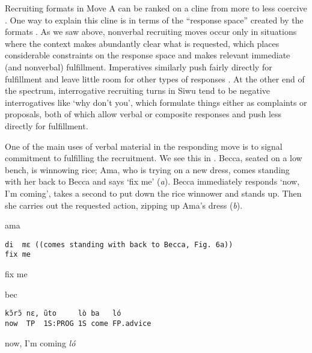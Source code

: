 \documentclass[output=paper]{langsci/langscibook}
\begin{document}
Recruiting formats in Move A can be ranked on a cline from more to less coercive \citep{brown_universals_1978}. One way to explain this cline is in terms of the “response space” created by the formats \citep[see][]{VinkhuyzenSzymanski2005,RossiZinken2016}. As we saw above, nonverbal recruiting moves occur only in situations where the context makes abundantly clear what is requested, which places considerable constraints on the response space and makes relevant immediate (and nonverbal) fulfillment. Imperatives similarly push fairly directly for fulfillment and leave little room for other types of responses \citep[see, e.g.,][]{kent_compliance_2012,Rossi2012}. At the other end of the spectrum, interrogative recruiting turns in Siwu tend to be negative interrogatives like ‘why don’t you’, which formulate things either as complaints or proposals, both of which allow verbal or composite responses and push less directly for fulfillment.

One of the main uses of verbal material in the responding move is to signal commitment to fulfilling the recruitment. We see this in  . Becca, seated on a low bench, is winnowing rice; Ama, who is trying on a new dress, comes standing with her back to Becca and says ‘fix me’ (\textit{a}). Becca immediately responds ‘now, I’m coming’, takes a second to put down the rice winnower and stands up. Then she carries out the requested action, zipping up Ama’s dress (\textit{b}).

\vspace{2mm}
%
%
\begin{mdframednoverticalspace}[style=firstfoc]
\begin{transbox}{2}{ama}
\begin{verbatim}
di  mɛ ((comes standing with back to Becca, Fig. 6a))
fix me
\end{verbatim}
fix me
\end{transbox}
\end{mdframednoverticalspace}
%
\begin{mdframednoverticalspace}[style=secondfoc]
\begin{transbox}{3}{bec}
\begin{verbatim}
kɔ̃rɔ̃ nɛ, ũto     lò ba   ló
now  TP  1S:PROG 1S come FP.advice
\end{verbatim}
now, I’m coming \textit{ló}
\end{transbox}
\end{mdframednoverticalspace}
%
\vspace{-1mm}
%
\begin{mdframednoverticalspace}[style=secondfoc]
\end{mdframednoverticalspace}
\end{document}
